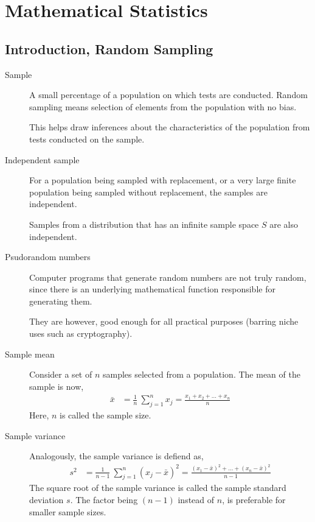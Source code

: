 \chapter{Mathematical Statistics}

\section{Introduction, Random Sampling}

\begin{description}
    \item[Sample] A small percentage of a population on which tests are conducted.
          Random sampling means selection of elements from the population with no bias.
          \par This helps draw inferences about the characteristics of the population
          from tests conducted on the sample.

    \item[Independent sample] For a population being sampled with replacement, or a
          very large finite population being sampled without replacement, the samples
          are independent. \par
          Samples from a distribution that has an infinite sample space $ S $ are also
          independent.

    \item[Psudorandom numbers] Computer programs that generate random numbers are not
          truly random, since there is an underlying mathematical function responsible
          for generating them. \par
          They are however, good enough for all practical purposes (barring niche uses
          such as cryptography).

    \item[Sample mean] Consider a set of $ n $ samples selected from a population. The
          mean of the sample is now,
          \begin{align}
              \bar{x} & = \frac{1}{n}\ \sum_{j=1}^{n} x_j
              = \frac{x_1 + x_2 + \dots + x_n}{n}
          \end{align}
          Here, $ n $ is called the sample size.

    \item[Sample variance] Analogously, the sample variance is defiend as,
          \begin{align}
              s^2 & = \frac{1}{n-1}\ \sum_{j=1}^{n} (x_j - \bar{x})^2
              = \frac{(x_1 - \bar{x})^2 + \dots + (x_n - \bar{x})^2}{n-1}
          \end{align}
          The square root of the sample variance is called the sample standard deviation
          $ s $. The factor being $ (n-1) $ instead of $ n $, is preferable for smaller
          sample sizes.
\end{description}

